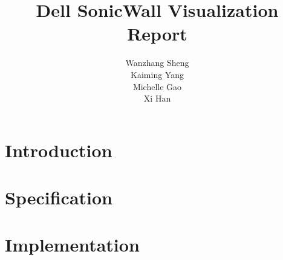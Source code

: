 \documentclass[paper=a4, fontsize=11pt]{report} %
\title{Dell SonicWall Visualization Report}
\author{
Wanzhang Sheng\\
Kaiming Yang\\
Michelle Gao\\
Xi Han
}
\begin{document}
\maketitle


\chapter{Introduction} %
\label{cha:introduction}





\chapter{Specification} %
\label{cha:specification}





\chapter{Implementation} %
\label{cha:implementation}
\end{document}
